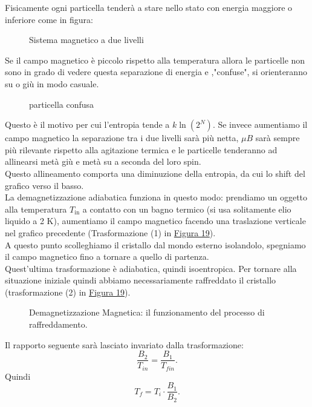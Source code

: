 \noindent
Fisicamente ogni particella tenderà a stare nello stato con energia maggiore o inferiore come in figura:
\begin{figure}[H]
    \centering
    \caption{Sistema magnetico a due livelli}
    \label{fig:sistema-magnetico-a-due-livelli}
\end{figure}
\noindent
Se il campo magnetico è piccolo rispetto alla temperatura allora le particelle non sono in grado di vedere questa separazione di energia e ,"confuse", si orienteranno su o giù in modo casuale.
\begin{figure}[H]
    \centering
    \caption{particella confusa}
    \label{fig:particella-confusa}
\end{figure}
\noindent
Questo è il motivo per cui l'entropia tende a $k\ln\left(2^N\right)$. Se invece aumentiamo il campo magnetico la separazione tra i due livelli sarà più netta, $\mu B$ sarà sempre più rilevante rispetto alla agitazione termica e le particelle tenderanno ad allinearsi metà giù e metà su a seconda del loro spin.\\
Questo allineamento comporta una diminuzione della entropia, da cui lo shift del grafico verso il basso.\\
La demagnetizzazione adiabatica funziona in questo modo: prendiamo un oggetto alla temperatura $T_{\text{in}}$ a contatto con un bagno termico (si usa solitamente elio liquido a 2 K), aumentiamo il campo magnetico facendo una traslazione verticale nel grafico precedente (Trasformazione (1) in \hyperref[fig:demagnetizzazione-adiabatica-1]{Figura 19}).\\
A questo punto scolleghiamo il cristallo dal mondo esterno isolandolo, spegniamo il campo magnetico fino a tornare a quello di partenza. \\
Quest'ultima trasformazione è adiabatica, quindi isoentropica. Per tornare alla situazione iniziale quindi abbiamo necessariamente raffreddato il cristallo (trasformazione (2) in \hyperref[fig:demagnetizzazione-adiabatica-1]{Figura 19}).
\begin{figure}[H]
    \centering
    \caption{Demagnetizzazione Magnetica: il funzionamento del processo di raffreddamento.}
    \label{fig:demagnetizzazione-adiabatica-1}
\end{figure}
\noindent
Il rapporto seguente sarà lasciato invariato dalla trasformazione:
\[
	\frac{B_2}{T_{in}} = \frac{B_1}{T_{fin}}
.\] 
Quindi 
\[
	T_{f} = T_{i}\cdot \frac{B_1}{B_2}
.\] 
